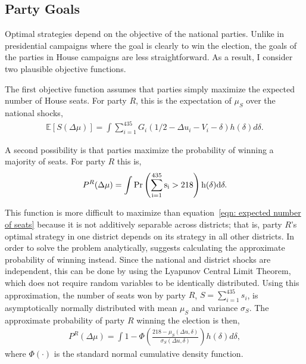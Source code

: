 \documentclass[12pt,final,fleqn]{article}
\theoremstyle{plain}
\newcommand\E{\mathbb{E}}
\begin{document}
\subsection{Party Goals}
Optimal strategies depend on the objective of the national parties. Unlike in presidential campaigns where the goal is clearly to win the election, the goals of the parties in House campaigns are less straightforward. As a result, I consider two plausible objective functions. 

The first objective function assumes that parties simply maximize the expected number of House seats. For party $R$, this is the expectation of $\mu_S$ over the national shocks,
\begin{align} \label{eqn: expected number of seats}
\E\left[S (\Delta \mu)\right] = \int \sum_{i=1}^{435} G_i(1/2 - \Delta u_i - V_i - \delta)h(\delta) d\delta.
\end{align}

A second possibility is that parties maximize the probability of winning a majority of seats. For party $R$ this is,
\begin{align}
P^R(\Delta \mu) = \int \rm{Pr}\left(\sum_{i=1}^{435} s_i > 218 \right) h(\delta)d \delta.
\end{align}

This function is more difficult to maximize than equation~\ref{eqn: expected number of seats} because it is not additively separable across districts; that is, party $R$'s optimal strategy in one district depends on its strategy in all other districts. In order to solve the problem analytically, \citet{stromberg2008electoral} suggests calculating the approximate probability of winning instead. Since the national and district shocks are independent, this can be done by using the Lyapunov Central Limit Theorem, which does not require random variables to be identically distributed. Using this approximation, the number of seats won by party $R$, $S=\sum_{i=1}^{435} s_i$, is asymptotically normally distributed with mean $\mu_S$ and variance $\sigma_S$. The approximate probability of party $R$ winning the election is then,
\begin{align}
P^R(\Delta \mu) = \int 1 - \Phi\left(\frac{218 - \mu_S(\Delta u, \delta)}{\sigma_S(\Delta u, \delta)}\right) h(\delta)d\delta,
\end{align}
where $\Phi(\cdot)$ is the standard normal cumulative density function.
\end{document}
